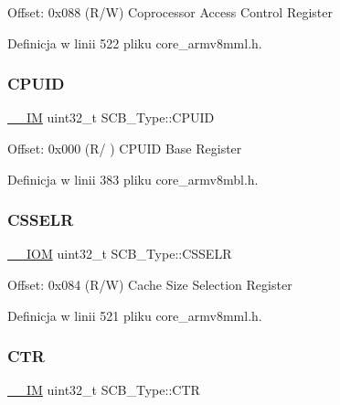 Offset\+: 0x088 (R/W) Coprocessor Access Control Register 

Definicja w linii 522 pliku core\+\_\+armv8mml.\+h.

\mbox{\label{struct_s_c_b___type_a21e08d546d8b641bee298a459ea73e46}} 
\subsubsection{\texorpdfstring{C\+P\+U\+ID}{CPUID}}
{\footnotesize\ttfamily \hyperlink{core__sc300_8h_a4cc1649793116d7c2d8afce7a4ffce43}{\+\_\+\+\_\+\+IM} uint32\+\_\+t S\+C\+B\+\_\+\+Type\+::\+C\+P\+U\+ID}

Offset\+: 0x000 (R/ ) C\+P\+U\+ID Base Register 

Definicja w linii 383 pliku core\+\_\+armv8mbl.\+h.

\mbox{\label{struct_s_c_b___type_ad3884e8b6504ec63c1eaa8742e94df3d}} 
\subsubsection{\texorpdfstring{C\+S\+S\+E\+LR}{CSSELR}}
{\footnotesize\ttfamily \hyperlink{core__sc300_8h_ab6caba5853a60a17e8e04499b52bf691}{\+\_\+\+\_\+\+I\+OM} uint32\+\_\+t S\+C\+B\+\_\+\+Type\+::\+C\+S\+S\+E\+LR}

Offset\+: 0x084 (R/W) Cache Size Selection Register 

Definicja w linii 521 pliku core\+\_\+armv8mml.\+h.

\mbox{\label{struct_s_c_b___type_af3fe705fef8762763b6d61dbdf0ccc3d}} 
\subsubsection{\texorpdfstring{C\+TR}{CTR}}
{\footnotesize\ttfamily \hyperlink{core__sc300_8h_a4cc1649793116d7c2d8afce7a4ffce43}{\+\_\+\+\_\+\+IM} uint32\+\_\+t S\+C\+B\+\_\+\+Type\+::\+C\+TR}

